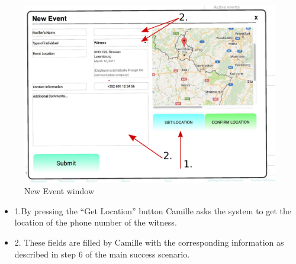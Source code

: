 \begin{minipage}{0.72\textwidth}
\begin{figure}[H]
\caption{New Event window}
\includegraphics[width=1.0\textwidth]{GetLocation.eps}
\end{figure}
\end{minipage} \hfill
\begin{minipage}{0.23\textwidth}
\begin{itemize}
\item 1.By pressing the ``Get Location'' button Camille asks the system to
get the location of the phone number of the witness.
\item 2. These fields are filled by Camille with the corresponding
information as described in step 6 of the main success scenario.
\end{itemize}
\end{minipage}

